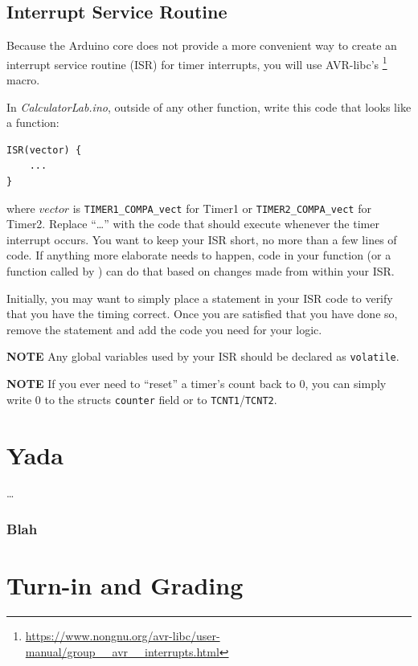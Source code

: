 \subsection{Interrupt Service Routine}

Because the Arduino core does not provide a more convenient way to create an
interrupt service routine (ISR) for timer interrupts, you will use AVR-libc's
\footnote{\url{https://www.nongnu.org/avr-libc/user-manual/group__avr__interrupts.html}}
macro.

In \textit{CalculatorLab.ino}, outside of any other function, write this code that looks like a function:

\begin{lstlisting}
ISR(vector) {
    ...
}
\end{lstlisting}

where $vector$ is \lstinline{TIMER1_COMPA_vect} for Timer1 or
\lstinline{TIMER2_COMPA_vect} for Timer2. Replace ``\dots'' with the code that
should execute whenever the timer interrupt occurs. You want to keep your ISR
short, no more than a few lines of code. If anything more elaborate needs to
happen, code in your  function (or a function called by
) can do that based on changes made from within your ISR.

Initially, you may want to simply place a  statement in your
ISR code to verify that you have the timing correct. Once you are satisfied
that you have done so, remove the  statement and add the code
you need for your logic.

\textbf{NOTE} Any global variables used by your ISR should be declared as \lstinline{volatile}.

\textbf{NOTE} If you ever need to ``reset'' a timer's count back to 0, you can
simply write 0 to the structs \lstinline{counter} field or to
\texttt{TCNT1}/\texttt{TCNT2}.

\section{Yada} \label{sec:yada}

\dots

\subsubsection{Blah}


\section*{Turn-in and Grading}

